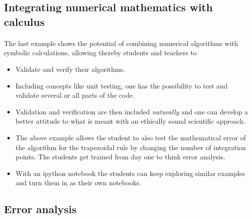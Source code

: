 \documentclass[%
twoside,                 %
final,                   %
10pt]{article}
\begin{document}
\subsection{Integrating numerical mathematics with calculus}

\paragraph{}
The last example shows the potential of combining numerical algorithms with symbolic calculations, allowing thereby students and teachers to

\begin{itemize}
\item Validate and verify  their  algorithms. 

\item Including concepts like unit testing, one has the possibility to test and validate several or all parts of the code.

\item Validation and verification are then included \emph{naturally} and one can develop a better attitude to what is meant with an ethically sound scientific approach.

\item The above example allows the student to also test the mathematical error of the algorithm for the trapezoidal rule by changing the number of integration points. The students get trained from day one to think error analysis. 

\item With an ipython notebook the students can keep exploring similar examples and turn them in as their own notebooks. 
\end{itemize}

\noindent



\subsection{Error analysis}

\end{document}
